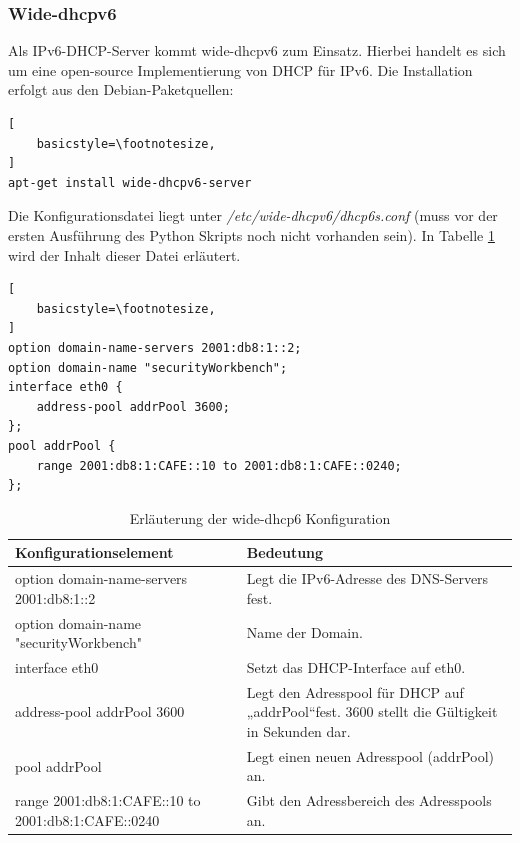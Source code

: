 \subsubsection*{Wide-dhcpv6}
Als IPv6-DHCP-Server kommt wide-dhcpv6 zum Einsatz. Hierbei handelt es sich um eine open-source Implementierung von DHCP für IPv6. Die Installation erfolgt aus den Debian-Paketquellen:
\lstset{language=bash}
\begin{lstlisting}[
	basicstyle=\footnotesize,
]
apt-get install wide-dhcpv6-server
\end{lstlisting}

Die Konfigurationsdatei liegt unter \textit{/etc/wide-dhcpv6/dhcp6s.conf} (muss vor der ersten Ausführung des Python Skripts noch nicht vorhanden sein). In Tabelle \ref{tab:wideDhcpConfig} wird der Inhalt dieser Datei erläutert.
\begin{lstlisting}[
	basicstyle=\footnotesize,
]
option domain-name-servers 2001:db8:1::2;
option domain-name "securityWorkbench";
interface eth0 {
	address-pool addrPool 3600;
};
pool addrPool {
	range 2001:db8:1:CAFE::10 to 2001:db8:1:CAFE::0240;
};

\end{lstlisting}

\begin{table}
	\centering
		\begin{tabular}{lp{9cm}}
			Konfigurationselement & Bedeutung \\ \hline
			option domain-name-servers 2001:db8:1::2 & Legt die IPv6-Adresse des DNS-Servers fest. \\
			option domain-name "securityWorkbench" & Name der Domain. \\
			interface eth0 & Setzt das DHCP-Interface auf eth0. \\
			address-pool addrPool 3600 & Legt den Adresspool für DHCP auf „addrPool“fest. 3600 stellt die Gültigkeit in Sekunden dar.  \\
			pool addrPool & Legt einen neuen Adresspool (addrPool) an. \\
			range 2001:db8:1:CAFE::10 to 2001:db8:1:CAFE::0240 & Gibt den Adressbereich des Adresspools an. \\
		\end{tabular}
	\caption{Erläuterung der wide-dhcp6 Konfiguration}
	\label{tab:wideDhcpConfig}
\end{table}

\FloatBarrier



